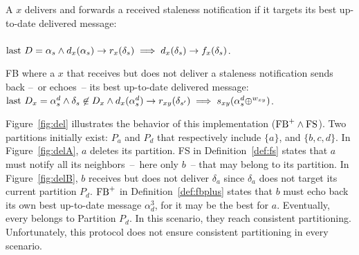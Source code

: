 

\begin{definition}
  A \process $x$ delivers and forwards  a received staleness
  notification if it targets its best up-to-date delivered message:\\
  \\
  $\textup{last}~D = \alpha_s \wedge d_x(\alpha_s) \rightarrow r_x(\delta_s)
  \implies d_x(\delta_s) \rightarrow f_x(\delta_s)$.
\end{definition}

\begin{definition} FB where
  a \process $x$ that receives but does not deliver a staleness
  notification sends back --~or echoes~-- its best up-to-date
  delivered message:
  $\textup{last}~D_x = \alpha_s^d \wedge \delta_s
  \not\in D_x \wedge d_x(\alpha_s^d)\rightarrow r_{xy}(\delta_{s'}) \implies
  s_{xy}(\alpha_s^d\oplus^{w_{xy}})$.

  
  
  
\end{definition}

Figure~\ref{fig:del} illustrates the behavior of this implementation
($\textup{FB}^+ \wedge \textup{FS}$).  Two partitions initially exist:
$P_a$ and $P_d$ that respectively include $\{a\}$, and $\{b, c,
d\}$. In Figure~\ref{fig:delA}, $a$ deletes its partition. FS in
Definition~\ref{def:fs} states that $a$ must notify all its
neighbors~--~here only $b$~-- that may belong to its partition.  In
Figure~\ref{fig:delB}, $b$ receives but does not deliver $\delta_a$
since $\delta_a$ does not target its current partition $P_d$.
$\textup{FB}^+$ in Definition~\ref{def:fbplus} states that $b$ must
echo back its own best up-to-date message $\alpha_d^3$, for it may be
the best for $a$. Eventually, every \process belongs to Partition
$P_d$. In this scenario, they reach consistent
partitioning. Unfortunately, this protocol does not ensure consistent
partitioning in every scenario.


